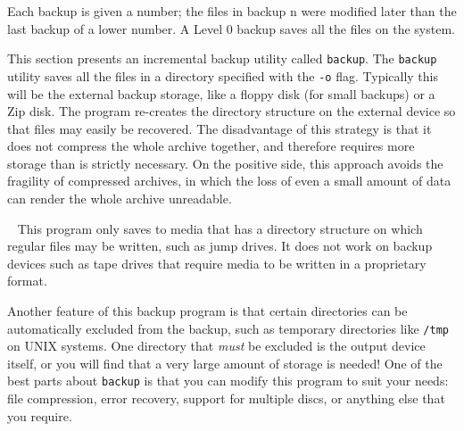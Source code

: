 Each backup is given a number; the files in backup n were
modified later than the last backup of a lower number. A Level 0 backup
saves all the files on the system.

This section presents an incremental backup utility called
\texttt{backup}. The \texttt{backup} utility saves all the files in a
directory specified with the \texttt{{}-o} flag. Typically this will be
the external backup storage, like a floppy disk (for small backups) or
a Zip disk. The program re-creates the directory structure on the
external device so that files may easily be recovered. The disadvantage
of this strategy is that it does not compress the whole archive
together, and therefore requires more storage than is strictly
necessary. On the positive side, this approach avoids the fragility of
compressed archives, in which the loss of even a small amount of data
can render the whole archive unreadable.

\bigskip{}\
{\sffamily
This program only saves to media that has a directory structure on which
regular files may be written, such as jump drives. It does not work on backup
devices such as tape drives that require media to be written in a
proprietary format.}

Another feature of this backup program is that certain directories can
be automatically excluded from the backup, such as temporary
directories like \texttt{/tmp} on UNIX systems. One directory that
{\em must\/} be excluded is the output device itself, or you will
find that a very large amount of storage is needed! One of the best
parts about \texttt{backup} is that you can modify this program to suit
your needs: file compression, error recovery, support for multiple
discs, or anything else that you require.

